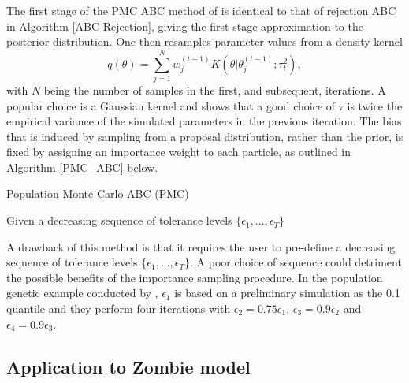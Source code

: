 \documentclass[]{article}
\begin{document}
The first stage of the PMC ABC method of \cite{RN21} is identical to that of rejection ABC in Algorithm \ref{ABC Rejection}, giving the first stage approximation to the posterior distribution. One then resamples parameter values from a density kernel 
$$ q(\theta) = \sum_{j=1}^{N} w_j^{(t-1)} K(\theta| \theta_{j}^{(t-1)};\tau_t^2),$$ 
with $N$ being the number of samples in the first, and subsequent, iterations. A popular choice is a Gaussian kernel and \cite{RN21} shows that a good choice of $\tau$ is twice the empirical variance of the simulated parameters in the previous iteration. The bias that is induced by sampling from a proposal distribution, rather than the prior, is fixed by assigning an importance weight to each particle, as outlined in Algorithm \ref{PMC_ABC} below. 


\begin{algorithm}[h]
	\caption{Population Monte Carlo ABC (PMC)}
	\label{PMC_ABC}
	Given a decreasing sequence of tolerance levels $\{\epsilon_1, ..., \epsilon_T\}$\;
\end{algorithm}	


A drawback of this method is that it requires the user to pre-define a decreasing sequence of tolerance levels $\{\epsilon_1, ..., \epsilon_T\}$. A poor choice of sequence could detriment the possible benefits of the importance sampling procedure. In the population genetic example conducted by \cite{RN21}, $\epsilon_1$ is based on a preliminary simulation as the 0.1 quantile and they perform four iterations with $\epsilon_2 = 0.75\epsilon_1$, $\epsilon_3 = 0.9\epsilon_2$ and $\epsilon_4 = 0.9\epsilon_3$.

\subsection{Application to Zombie model}
\end{document}

